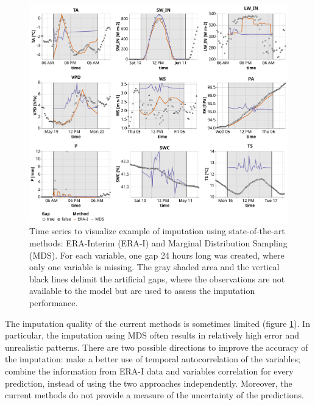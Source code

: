 \documentclass{article}
\newcommand{\imgwidth}{6in}
\begin{document}
\begin{figure}
    \centerline{\includegraphics[width=\imgwidth]{timeseries_sota.pdf}}
\caption{Time series to visualize example of imputation using state-of-the-art methods: ERA-Interim (ERA-I) and Marginal Distribution Sampling (MDS). For each variable, one gap 24 hours long was created, where only one variable is missing. The gray shaded area and the vertical black lines delimit the artificial gaps, where the observations are not available to the model but are used to assess the imputation performance.}
\label{fig:ts_sota}
\end{figure}

The imputation quality of the current methods is sometimes limited (figure \ref{fig:ts_sota}). In particular, the imputation using MDS often results in relatively high error and unrealistic patterns. There are two possible directions to improve the accuracy of the imputation:  make a better use of temporal autocorrelation of the variables; combine the information from ERA-I data and variables correlation for every prediction, instead of using the two approaches independently. Moreover, the current methods do not provide a measure of the uncertainty of the predictions.
\end{document}
